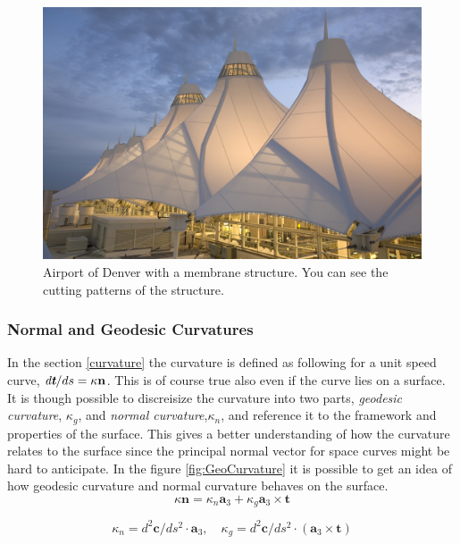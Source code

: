 \begin{figure}[H]
\centering
\includegraphics[width=0.9\linewidth ]{figure/Theory/Denver.jpg}
\caption{Airport of Denver with a membrane structure. You can see the cutting patterns of the structure. }
\end{figure}




\subsubsection{Normal and Geodesic Curvatures}

In the section \ref{curvature} the curvature is defined as following for a unit speed curve,
$\textit{d\textbf{t}}/ds = \kappa \textbf{n}$. This is of course true also even if the curve lies on a surface. It is though possible to discreisize the curvature into two parts, \textit{geodesic curvature}, $\kappa_g$, and \textit{normal curvature},$\kappa_n$, and reference it to the framework and properties of the surface. This gives a better understanding of how the curvature relates to the surface since the principal normal vector for space curves might be hard to anticipate. In the figure \ref{fig:GeoCurvature} it is possible to get an idea of how geodesic curvature and normal curvature behaves on the surface.
\begin{equation}
\kappa \textbf{n} = \kappa_n \textbf{a}_3 + \kappa_g\textbf{a}_3 \times \textbf{t}
\end{equation}

\begin{equation}
\kappa_n = d^2\textbf{c}/ds^2 \cdot \textbf{a}_3,\quad \kappa_g = d^2\textbf{c}/ds^2 \cdot(\textbf{a}_3 \times \textbf{t})
\end{equation}


